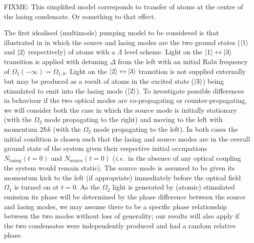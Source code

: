 FIXME: This simplified model corresponds to transfer of atoms at the centre of the lasing condensate.  Or something to that effect.

The first idealised (multimode) pumping model to be considered is that illustrated in  in which the source and lasing modes are the two ground states (${\left|1\right>}$ and ${\left|2\right>}$ respectively) of atoms with a $\Lambda$ level scheme.  Light on the ${\left|1\right>} \leftrightarrow {\ensuremath{\left|3\right>}}$ transition is applied with detuning $\Delta$ from the left with an initial Rabi frequency of $\Omega_1(-\infty) = \Omega_{1, 0}$.  Light on the ${\left|2\right>} \leftrightarrow {\ensuremath{\left|3\right>}}$ transition is not supplied externally but may be produced as a result of atoms in the excited state (${\left|3\right>}$) being stimulated to emit into the lasing mode (${\left|2\right>}$).  To investigate possible differences in behaviour if the two optical modes are co-propagating or counter-propagating, we will consider both the case in which the source mode is initially stationary (with the $\Omega_2$ mode propagating to the right) and moving to the left with momentum $2 \hbar k$ (with the $\Omega_2$ mode propagating to the left).  In both cases the initial condition is chosen such that the lasing and source modes are in the overall ground state of the system given their respective initial occupations $N_\text{lasing}(t=0)$ and $N_\text{source}(t=0)$ (\emph{i.e.}\  in the absence of any optical coupling the system would remain static).  The source mode is assumed to be given its momentum kick to the left (if appropriate) immediately before the optical field $\Omega_1$ is turned on at $t=0$.  As the $\Omega_2$ light is generated by (atomic) stimulated emission its phase will be determined by the phase difference between the source and lasing modes, we may assume there to be a specific phase relationship between the two modes without loss of generality; our results will also apply if the two condensates were independently produced and had a random relative phase.

